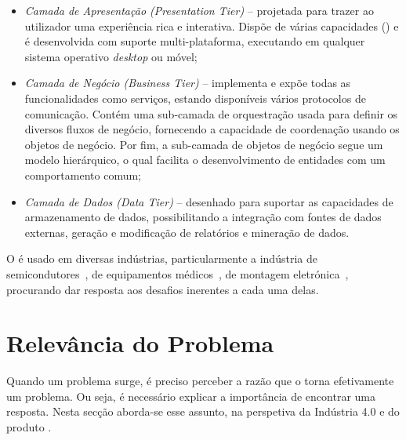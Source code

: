 \begin{itemize}
    \item 
    {
        \textit{Camada de Apresentação (Presentation Tier)} -- projetada para trazer ao utilizador uma experiência rica e interativa. Dispõe de várias capacidades () e é desenvolvida com suporte multi-plataforma, executando em qualquer sistema operativo \textit{desktop} ou móvel;
    }
    \item
    {
        \textit{Camada de Negócio (Business Tier)} -- implementa e expõe todas as funcionalidades como serviços, estando disponíveis vários protocolos de comunicação. Contém uma sub-camada de orquestração usada para definir os diversos fluxos de negócio, fornecendo a capacidade de coordenação usando os objetos de negócio. Por fim, a sub-camada de objetos de negócio segue um modelo hierárquico, o qual facilita o desenvolvimento de entidades com um comportamento comum;
    }
    \item
    {
        \textit{Camada de Dados (Data Tier)} -- desenhado para suportar as capacidades de armazenamento de dados, possibilitando a integração com fontes de dados externas, geração e modificação de relatórios e mineração de dados.
    }
\end{itemize}

O {\productname} é usado em diversas indústrias, particularmente a indústria de semicondutores~\parencite{cmf_industries_semiconductor}, de equipamentos médicos~\parencite{cmf_industries_medical_devices}, de montagem eletrónica~\parencite{cmf_industries_electronics}, procurando dar resposta aos desafios inerentes a cada uma delas.

\section{Relevância do Problema}
\label{sec:chap02_relevance}
Quando um problema surge, é preciso perceber a razão que o torna efetivamente um problema. Ou seja, é necessário explicar a importância de encontrar uma resposta. Nesta secção aborda-se esse assunto, na perspetiva da Indústria 4.0 e do produto {\productname}.

